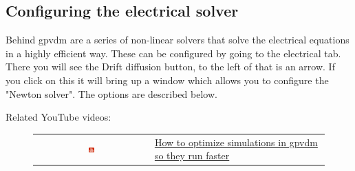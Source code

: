 \newpage
\subsection{Configuring the electrical solver}
\label{sec:solverconfig}




Behind gpvdm are a series of non-linear solvers that solve the electrical equations in a highly efficient way.  These can be configured by going to the electrical tab. There you will see the Drift diffusion button, to the left of that is an arrow. If you click on this it will bring up a window which allows you to configure the "Newton solver". The options are described below.

Related YouTube videos:
\begin{figure}[H]

\begin{tabular}{ c l }

\includegraphics[width=0.05\textwidth]{./images/youtube.png}

&
\href{https://www.youtube.com/watch?v=D2WG1_wTbdc}{How to optimize simulations in gpvdm so they run faster}

\end{tabular}
\end{figure}

